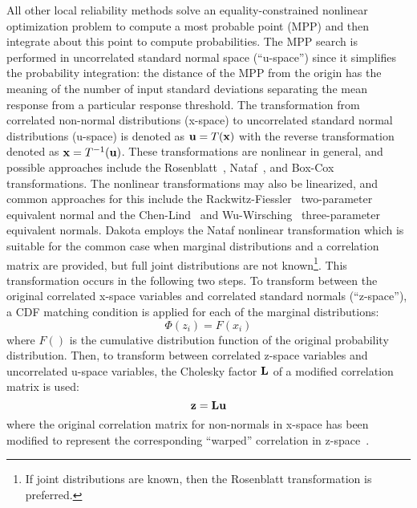 All other local reliability methods solve an equality-constrained nonlinear
optimization problem to compute a most probable point (MPP) and then
integrate about this point to compute probabilities.  The MPP search
is performed in uncorrelated standard normal space (``u-space'') since
it simplifies the probability integration: the distance of the MPP
from the origin has the meaning of the number of input standard
deviations separating the mean response from a particular response
threshold.  The transformation from correlated non-normal
distributions (x-space) to uncorrelated standard normal distributions
(u-space) is denoted as ${\bf u} = T({\bf x})$ with the reverse
transformation denoted as ${\bf x} = T^{-1}({\bf u})$.  These
transformations are nonlinear in general, and possible approaches
include the Rosenblatt~\cite{Ros52}, Nataf~\cite{Der86}, and
Box-Cox~\cite{Box64} transformations.  The nonlinear transformations
may also be linearized, and common approaches for this include the
Rackwitz-Fiessler~\cite{Rac78} two-parameter equivalent normal and the
Chen-Lind~\cite{Che83} and Wu-Wirsching~\cite{Wu87} three-parameter
equivalent normals.  Dakota employs the Nataf nonlinear transformation
which is suitable for the common case when marginal distributions and
a correlation matrix are provided, but full joint distributions are
not known\footnote{If joint distributions are known, then the
Rosenblatt transformation is preferred.}.  This transformation occurs 
in the following two steps.  To transform between the
original correlated x-space variables and correlated standard normals
(``z-space''), a CDF matching condition is applied for each of the
marginal distributions:
\begin{equation}
\Phi(z_i) = F(x_i) \label{eq:trans_zx}
\end{equation}
where $F()$ is the cumulative distribution function of the original
probability distribution.  Then, to transform between correlated
z-space variables and uncorrelated u-space variables, the Cholesky 
factor ${\bf L}$ of a modified correlation matrix is used:
\begin{equation}
{\bf z} = {\bf L} {\bf u} \label{eq:trans_zu}
\end{equation}
where the original correlation matrix for non-normals in x-space has
been modified to represent the corresponding ``warped'' correlation in 
z-space~\cite{Der86}.

